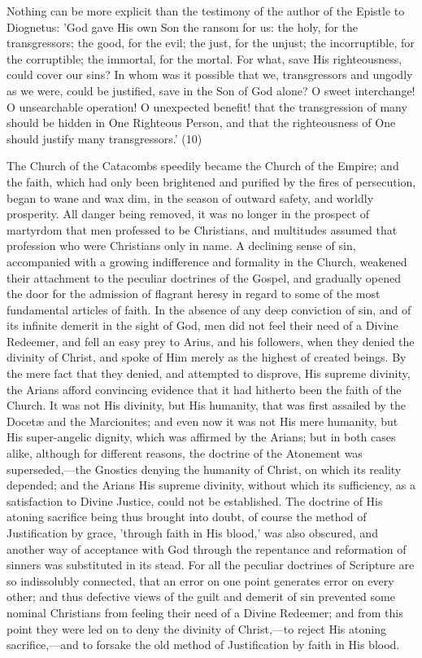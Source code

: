 \documentclass[
]{book}
\begin{document}
Nothing can be more explicit than the testimony of the author of the Epistle to Diognetus: 'God gave His own Son the ransom for us: the holy, for the transgressors; the good, for the evil; the just, for the unjust; the incorruptible, for the corruptible; the immortal, for the mortal. For what, save His righteousness, could cover our sins? In whom was it possible that we, transgressors and ungodly as we were, could be justified, save in the Son of God alone? O sweet interchange! O unsearchable operation! O unexpected benefit! that the transgression of many should be hidden in One Righteous Person, and that the righteousness of One should justify many transgressors.' (10)

The Church of the Catacombs speedily became the Church of the Empire; and the faith, which had only been brightened and purified by the fires of persecution, began to wane and wax dim, in the season of outward safety, and worldly prosperity. All danger being removed, it was no longer in the prospect of martyrdom that men professed to be Christians, and multitudes assumed that profession who were Christians only in name. A declining sense of sin, accompanied with a growing indifference and formality in the Church, weakened their attachment to the peculiar doctrines of the Gospel, and gradually opened the door for the admission of flagrant heresy in regard to some of the most fundamental articles of faith. In the absence of any deep conviction of sin, and of its infinite demerit in the sight of God, men did not feel their need of a Divine Redeemer, and fell an easy prey to Arius, and his followers, when they denied the divinity of Christ, and spoke of Him merely as the highest of created beings. By the mere fact that they denied, and attempted to disprove, His supreme divinity, the Arians afford convincing evidence that it had hitherto been the faith of the Church. It was not His divinity, but His humanity, that was first assailed by the Docetæ and the Marcionites; and even now it was not His mere humanity, but His super-angelic dignity, which was affirmed by the Arians; but in both cases alike, although for different reasons, the doctrine of the Atonement was superseded,---the Gnostics denying the humanity of Christ, on which its reality depended; and the Arians His supreme divinity, without which its sufficiency, as a satisfaction to Divine Justice, could not be established. The doctrine of His atoning sacrifice being thus brought into doubt, of course the method of Justification by grace, 'through faith in His blood,' was also obscured, and another way of acceptance with God through the repentance and reformation of sinners was substituted in its stead. For all the peculiar doctrines of Scripture are so indissolubly connected, that an error on one point generates error on every other; and thus defective views of the guilt and demerit of sin prevented some nominal Christians from feeling their need of a Divine Redeemer; and from this point they were led on to deny the divinity of Christ,---to reject His atoning sacrifice,---and to forsake the old method of Justification by faith in His blood.
\end{document}

